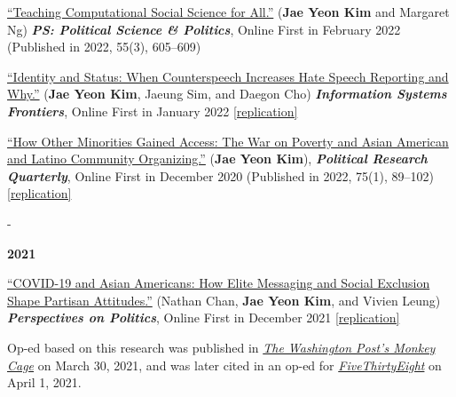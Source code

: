 \documentclass[10pt, letterpaper]{article}
\makeatletter
\newcommand{\needspace}[1]{%
  \par\penalty-100\begingroup
  \setlength{\dimen@}{#1}%
  \dimen@ii\pagegoal \advance\dimen@ii-\pagetotal
  \ifdim\dimen@>\dimen@ii \break\fi
  \endgroup
}
\newcommand{\pubyear}[1]{\needspace{6\baselineskip}\item[]\vspace{0.3\baselineskip}\textbf{#1}}
\renewenvironment{itemize}{
\begin{list}{}{
        \setlength{\leftmargin}{1.5em}
        \setlength{\itemsep}{0.10em}
        \setlength{\parskip}{0pt}
        \setlength{\parsep}{0.10em}
    }
}{
\end{list}
}
\makeatother
\begin{document}
\begin{etaremune}
\item \href{https://www.cambridge.org/core/journals/ps-political-science-and-politics/article/abs/teaching-computational-social-science-for-all/66EAB886BCF21C647E2387051D6A9BEF}{``Teaching Computational Social Science for All.''} (\textbf{Jae Yeon Kim} and Margaret Ng) \textbf{\textit{PS: Political Science \& Politics}}, Online First in February 2022 (Published in 2022, 55(3), 605--609)

\item \href{https://link.springer.com/article/10.1007/s10796-021-10229-2}{``Identity and Status: When Counterspeech Increases Hate Speech Reporting and Why.''} (\textbf{Jae Yeon Kim}, Jaeung Sim, and Daegon Cho) \textbf{\textit{Information Systems Frontiers}}, Online First in January 2022 \href{https://github.com/jaeyk/status_identity_hate_speech_reporting}{[replication]}

\item \href{https://journals.sagepub.com/doi/10.1177/1065912920983456}{``How Other Minorities Gained Access: The War on Poverty and Asian American and Latino Community Organizing.''} (\textbf{Jae Yeon Kim}), \textbf{\textit{Political Research Quarterly}}, Online First in December 2020 (Published in 2022, 75(1), 89--102) \href{https://github.com/jaeyk/regression-analysis-with-time-series-data}{[replication]}

\pubyear{2021}
\item \href{https://t.co/4Axd0gEQns}{``COVID-19 and Asian Americans: How Elite Messaging and Social Exclusion Shape Partisan Attitudes.''} (Nathan Chan, \textbf{Jae Yeon Kim}, and Vivien Leung) \textbf{\textit{Perspectives on Politics}}, Online First in December 2021 \href{https://github.com/jaeyk/covid19antiasian/}{[replication]}
\begin{itemize}
    \item Op-ed based on this research was published in \textit{\href{https://www.washingtonpost.com/politics/2021/03/30/thanks-trumps-rhetoric-asian-americans-are-moving-toward-democratic-party/?utm_campaign=wp_monkeycage&utm_medium=social&utm_source=twitter&tid=sm_tw_monkeycage}{The Washington Post's Monkey Cage}} on March 30, 2021, and was later cited in an op-ed for \textit{\href{https://fivethirtyeight.com/features/why-the-recent-violence-against-asian-americans-may-solidify-their-support-of-democrats/}{FiveThirtyEight}} on April 1, 2021.
\end{itemize}


\end{etaremune}
\end{document}
